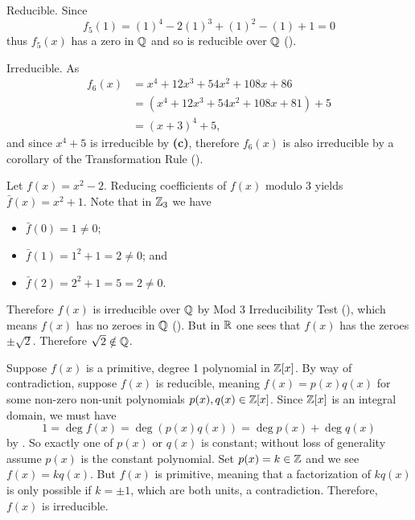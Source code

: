 \begin{questions}
\begin{partquestions}{\alph*}
        \item Reducible. Since
        \[
            f_5(1) = (1)^4 - 2(1)^3 + (1)^2 - (1) + 1 = 0
        \]
        thus $f_5(x)$ has a zero in $\mathbb{Q}$ and so is reducible over $\mathbb{Q}$ ().

        \item Irreducible. As
        \begin{align*}
            f_6(x) &= x^4 + 12x^3 + 54x^2 + 108x + 86\\
            &= (x^4 + 12x^3 + 54x^2 + 108x + 81) + 5\\
            &= (x+3)^4 + 5,
        \end{align*}
        and since $x^4 + 5$ is irreducible by \textbf{(c)}, therefore $f_6(x)$ is also irreducible by a corollary of the Transformation Rule ().
    \end{partquestions}

    \item Let $f(x) = x^2 - 2$. Reducing coefficients of $f(x)$ modulo 3 yields $\bar{f}(x) = x^2 + 1$. Note that in $\mathbb{Z}_3$ we have
    \begin{itemize}
        \item $\bar{f}(0) = 1 \neq 0$;
        \item $\bar{f}(1) = 1^2 + 1 = 2 \neq 0$; and
        \item $\bar{f}(2) = 2^2 + 1 = 5 = 2 \neq 0$.
    \end{itemize}
    Therefore $f(x)$ is irreducible over $\mathbb{Q}$ by Mod 3 Irreducibility Test (), which means $f(x)$ has no zeroes in $\mathbb{Q}$ (). But in $\mathbb{R}$ one sees that $f(x)$ has the zeroes $\pm\sqrt2$. Therefore $\sqrt2 \notin \mathbb{Q}$.

    \item Suppose $f(x)$ is a primitive, degree 1 polynomial in $\mathbb{Z}[x]$. By way of contradiction, suppose $f(x)$ is reducible, meaning $f(x) = p(x)q(x)$ for some non-zero non-unit polynomials $p(x), q(x) \in \mathbb{Z}[x]$. Since $\mathbb{Z}[x]$ is an integral domain, we must have
    \[
        1 = \deg f(x) = \deg(p(x)q(x)) = \deg p(x) + \deg q(x)
    \]
    by . So exactly one of $p(x)$ or $q(x)$ is constant; without loss of generality assume $p(x)$ is the constant polynomial. Set $p(x) = k \in \mathbb{Z}$ and we see $f(x) = kq(x)$. But $f(x)$ is primitive, meaning that a factorization of $kq(x)$ is only possible if $k = \pm1$, which are both units, a contradiction. Therefore, $f(x)$ is irreducible.


\end{questions}
